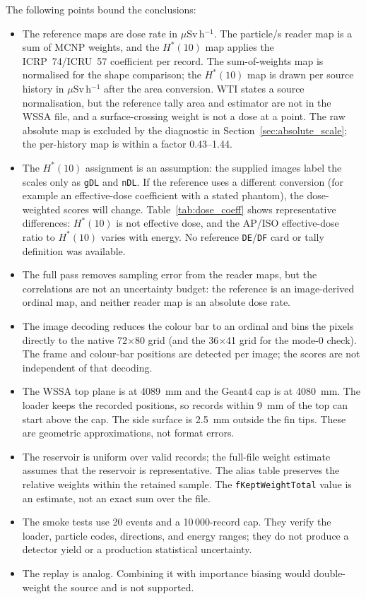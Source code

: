 \documentclass[11pt,a4paper]{article}
\begin{document}
The following points bound the conclusions:
\begin{itemize}
  \item The reference maps are dose rate in $\mu$Sv\,h$^{-1}$.  The particle/s
        reader map is a sum of MCNP weights, and the $H^*(10)$ map applies the
        ICRP~74/ICRU~57 coefficient per record.  The sum-of-weights map is
        normalised for the shape comparison; the $H^*(10)$ map is drawn per
        source history in $\mu$Sv\,h$^{-1}$ after the area conversion.  WTI states a source normalisation, but the
        reference tally area and estimator are not in the WSSA file, and a
        surface-crossing weight is not a dose at a point.  The raw absolute map
        is excluded by the diagnostic in Section~\ref{sec:absolute_scale}; the
        per-history map is within a factor 0.43--1.44.
  \item The $H^*(10)$ assignment is an assumption: the supplied images label
        the scales only as \texttt{gDL} and \texttt{nDL}.  If the reference uses
        a different conversion (for example an effective-dose coefficient with a
        stated phantom), the dose-weighted scores will change.  Table~\ref{tab:dose_coeff}
        shows representative differences: \(H^*(10)\) is not effective dose, and
        the AP/ISO effective-dose ratio to \(H^*(10)\) varies with energy.  No
        reference \texttt{DE}/\texttt{DF} card or tally definition was available.
  \item The full pass removes sampling error from the reader maps, but the
        correlations are not an uncertainty budget: the reference is an
        image-derived ordinal map, and neither reader map is an absolute dose
        rate.
  \item The image decoding reduces the colour bar to an ordinal and bins the
        pixels directly to the native 72$\times$80 grid (and the 36$\times$41
        grid for the mode-0 check).  The frame and colour-bar positions are
        detected per image; the scores are not independent of that decoding.
  \item The WSSA top plane is at 4089~mm and the Geant4 cap is at 4080~mm.  The
        loader keeps the recorded positions, so records within 9~mm of the top
        can start above the cap.  The side surface is 2.5~mm outside the fin
        tips.  These are geometric approximations, not format errors.
  \item The reservoir is uniform over valid records; the full-file weight
        estimate assumes that the reservoir is representative.  The alias table
        preserves the relative weights within the retained sample.  The
        \texttt{fKeptWeightTotal} value is an estimate, not an exact sum over
        the file.
  \item The smoke tests use 20 events and a 10\,000-record cap.  They verify the
        loader, particle codes, directions, and energy ranges; they do not
        produce a detector yield or a production statistical uncertainty.
  \item The replay is analog.  Combining it with importance biasing would
        double-weight the source and is not supported.
\end{itemize}
\end{document}
